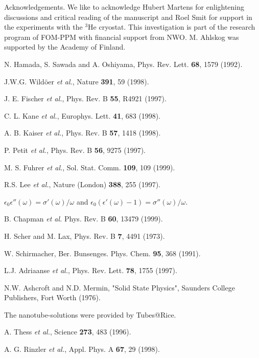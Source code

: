 \begin{multicols}{2}
Acknowledgements. We like to acknowledge Hubert Martens for enlightening
discussions and critical reading of the manuscript and Roel Smit for support
in the experiments with the $^3$He cryostat.  This investigation is part of
the research program of FOM-PPM with financial support from NWO. M. Ahlskog
was  supported by the Academy of Finland.

\begin{thebibliography}{10}

{N. Hamada, S. Sawada and A. Oshiyama, Phys. Rev. Lett. {\bf 68}, 1579
(1992).}

{J.W.G. Wild\"oer {\sl et al.}, Nature {\bf 391}, 59 (1998).}

{J. E. Fischer {\sl et al.}, Phys. Rev. B {\bf 55}, R4921 (1997).}

{C. L. Kane {\sl et al.}, Europhys. Lett. {\bf 41}, 683 (1998).}

{A. B. Kaiser {\sl et al.}, Phys. Rev. B {\bf 57}, 1418 (1998).}

{P. Petit {\sl et al.}, Phys. Rev. B {\bf 56}, 9275 (1997). }

{M. S. Fuhrer {\sl et al.}, Sol. Stat. Comm. {\bf 109}, 109 (1999).}

{R.S. Lee {\sl et al.}, Nature (London) {\bf 388}, 255 (1997). }

 $\epsilon_0 \epsilon''(\omega)=\sigma'(\omega)/ \omega$ and
$\epsilon_0(\epsilon'(\omega)-1)=\sigma''(\omega)/\omega$.

 B. Chapman {\it et al.} Phys. Rev. B {\bf 60}, 13479
(1999).

{H. Scher and M. Lax, Phys. Rev. B {\bf 7}, 4491 (1973).}

{W. Schirmacher, Ber. Bunsenges. Phys. Chem. {\bf 95}, 368 (1991). }

{L.J. Adriaanse {\sl et al.}, Phys. Rev. Lett. {\bf 78}, 1755 (1997).}

{N.W. Ashcroft and N.D. Mermin, "Solid State Physics", Saunders College
  Publishers, Fort Worth (1976). }

{The nanotube-solutions were provided by Tubes@Rice. }

{A. Thess {\sl et al.}, Science {\bf 273}, 483 (1996).}

{A. G. Rinzler {\sl et al.}, Appl. Phys. A {\bf 67}, 29 (1998).}


\end{thebibliography}
\end{multicols}
